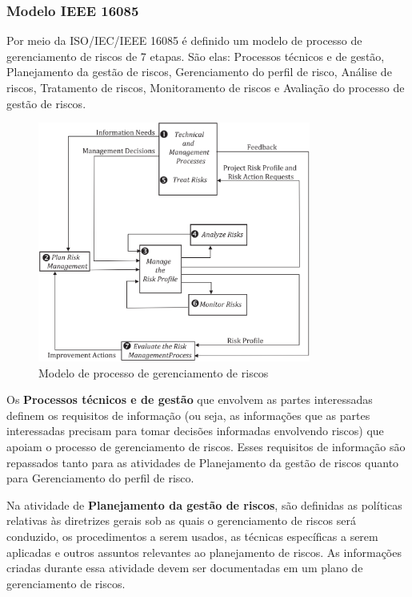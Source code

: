 \documentclass[
	12pt,
	openright,
	twoside,
	a4paper,
	english,
	brazil
	]{abntex2}
\begin{document}

\subsubsection{Modelo IEEE 16085}

Por meio da ISO/IEC/IEEE 16085 é definido um modelo de processo de gerenciamento de riscos de 7 etapas. São elas: Processos técnicos e de gestão, Planejamento da gestão de riscos, Gerenciamento do perfil de risco, Análise de riscos, Tratamento de riscos, Monitoramento de riscos e Avaliação do processo de gestão de riscos.

\begin{figure}[H]
  \centering
	\caption{\label{modelo-processo-gerenciamento-riscos}Modelo de processo de gerenciamento de riscos}
  \includegraphics[width=0.8\textwidth]{modelo-processo-gerenciamento-riscos}
\end{figure}

Os \textbf{Processos técnicos e de gestão} que envolvem as partes interessadas definem os requisitos de informação (ou seja, as informações que as partes interessadas precisam para tomar decisões informadas envolvendo riscos) que apoiam o processo de gerenciamento de riscos. Esses requisitos de informação são repassados tanto para as atividades de Planejamento da gestão de riscos quanto para Gerenciamento do perfil de risco.

Na atividade de \textbf{Planejamento da gestão de riscos}, são definidas as políticas relativas às diretrizes gerais sob as quais o gerenciamento de riscos será conduzido, os procedimentos a serem usados, as técnicas específicas a serem aplicadas e outros assuntos relevantes ao planejamento de riscos. As informações criadas durante essa atividade devem ser documentadas em um plano de gerenciamento de riscos.
\end{document}
